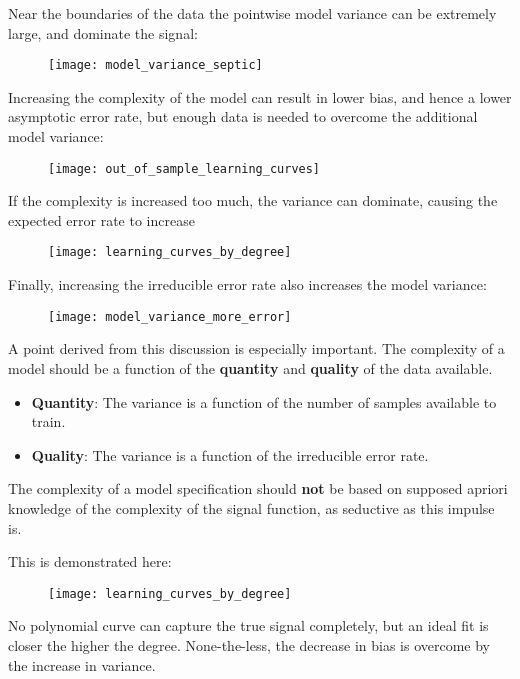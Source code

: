 %
%
\begin{frame}
  Near the boundaries of the data the pointwise model variance can be extremely
  large, and dominate the signal:
  \begin{figure}
    \texttt{[image: model\_variance\_septic]}
  \end{figure}
\end{frame}
%
%
\begin{frame}
  Increasing the complexity of the model can result in lower bias, and hence a
  lower asymptotic error rate, but enough data is needed to overcome the
  additional model variance:
  \begin{figure}
    \texttt{[image: out\_of\_sample\_learning\_curves]}
  \end{figure}
\end{frame}
%
%
\begin{frame}
  If the complexity is increased too much, the variance can dominate, causing
  the expected error rate to increase
  \begin{figure}
    \texttt{[image: learning\_curves\_by\_degree]}
  \end{figure}
\end{frame}
%
%
\begin{frame}
  Finally, increasing the irreducible error rate also increases the model variance:
  \begin{figure}
    \texttt{[image: model\_variance\_more\_error]}
  \end{figure}
\end{frame}
%
%
\begin{frame}
  A point derived from this discussion is especially important.  The complexity
  of a model should be a function of the \textbf{quantity} and \textbf{quality}
  of the data available.
  \begin{itemize}
    \item \textbf{Quantity}: The variance is a function of the number of samples
    available to train.
    \item \textbf{Quality}: The variance is a function of the irreducible error rate.
  \end{itemize}
\end{frame}
%
\begin{frame}
  The complexity of a model specification should \textbf{not} be based on
  supposed apriori knowledge of the complexity of the signal function, as
  seductive as this impulse is.
\end{frame}
%
%
\begin{frame}
  This is demonstrated here:
  \begin{figure}
    \texttt{[image: learning\_curves\_by\_degree]}
  \end{figure}
  No polynomial curve can capture the true signal completely, but an ideal fit
  is closer the higher the degree.  None-the-less, the decrease in bias is
  overcome by the increase in variance.
\end{frame}

